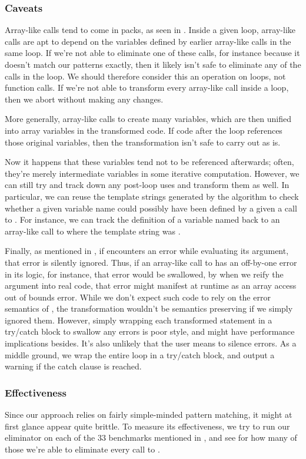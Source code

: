 \subsubsection{Caveats}

Array-like calls tend to come in packs, as seen in .
Inside a given loop, array-like calls are apt to depend on the variables
defined by earlier array-like calls in the same loop. If we're not able to
eliminate one of these calls, for instance because it doesn't match our
patterns exactly, then it likely isn't safe to eliminate any of the calls in
the loop. We should therefore consider this an operation on loops, not function
calls. If we're not able to transform every array-like call inside a loop, then
we abort without making any changes.

More generally, array-like calls to  create many variables, which
are then unified into array variables in the transformed code. If code after
the loop references those original variables, then the transformation isn't
safe to carry out as is.

Now it happens that these variables tend not to be referenced afterwards;
often, they're merely intermediate variables in some iterative computation.
However, we can still try and track down any post-loop uses and transform them
as well. In particular, we can reuse the template strings generated by the
algorithm to check whether a given variable name could possibly have been
defined by a given a call to . For instance, we can track the
definition of a variable named  back to an array-like call to
 where the template string was .

Finally, as mentioned in , if  encounters an error
while evaluating its argument, that error is silently ignored. Thus, if an
array-like call to  has an off-by-one error in its logic, for
instance, that error would be swallowed, by when we reify the argument into
real code, that error might manifest at runtime as an array access out of
bounds error. While we don't expect such code to rely on the error semantics of
, the transformation wouldn't be semantics preserving if we simply
ignored them. However, simply wrapping each transformed statement in a
try/catch block to swallow any errors is poor style, and might have performance
implications besides. It's also unlikely that the user means to silence errors.
As a middle ground, we wrap the entire loop in a try/catch block, and output a
warning if the catch clause is reached.

\subsubsection{Effectiveness}

Since our approach relies on fairly simple-minded pattern matching, it might at
first glance appear quite brittle. To measure its effectiveness, we try to run
our eliminator on each of the 33 benchmarks mentioned in
, and see for how many of those we're able to
eliminate every call to .
